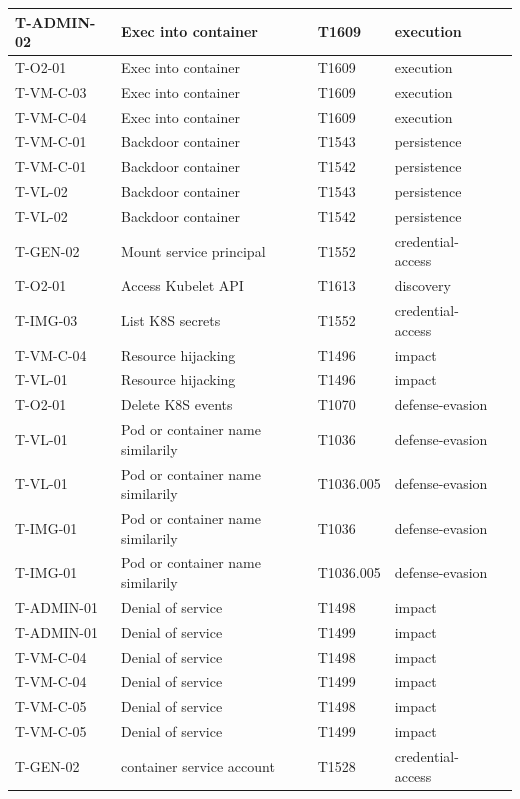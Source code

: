 \begin{longtable}{|l|l|l|l|l|}
T-ADMIN-02 & Exec into container & T1609 & execution \\ \hline
T-O2-01 & Exec into container & T1609 & execution \\ \hline
T-VM-C-03 & Exec into container & T1609 & execution \\ \hline
T-VM-C-04 & Exec into container & T1609 & execution \\ \hline
T-VM-C-01 & Backdoor container & T1543 & persistence \\ \hline
T-VM-C-01 & Backdoor container & T1542 & persistence \\ \hline
T-VL-02 & Backdoor container & T1543 & persistence \\ \hline
T-VL-02 & Backdoor container & T1542 & persistence \\ \hline
T-GEN-02 & Mount service principal & T1552 & credential-access \\ \hline
T-O2-01 & Access Kubelet API & T1613 & discovery \\ \hline
T-IMG-03 & List K8S secrets & T1552 & credential-access \\ \hline
T-VM-C-04 & Resource hijacking & T1496 & impact \\ \hline
T-VL-01 & Resource hijacking & T1496 & impact \\ \hline
T-O2-01 & Delete K8S events & T1070 & defense-evasion \\ \hline
T-VL-01 & Pod or container name similarily & T1036 & defense-evasion \\ \hline
T-VL-01 & Pod or container name similarily & T1036.005 & defense-evasion \\ \hline
T-IMG-01 & Pod or container name similarily & T1036 & defense-evasion \\ \hline
T-IMG-01 & Pod or container name similarily & T1036.005 & defense-evasion \\ \hline
T-ADMIN-01 & Denial of service & T1498 & impact \\ \hline
T-ADMIN-01 & Denial of service & T1499 & impact \\ \hline
T-VM-C-04 & Denial of service & T1498 & impact \\ \hline
T-VM-C-04 & Denial of service & T1499 & impact \\ \hline
T-VM-C-05 & Denial of service & T1498 & impact \\ \hline
T-VM-C-05 & Denial of service & T1499 & impact \\ \hline
T-GEN-02 & container service account & T1528 & credential-access \\ \hline

\end{longtable}

